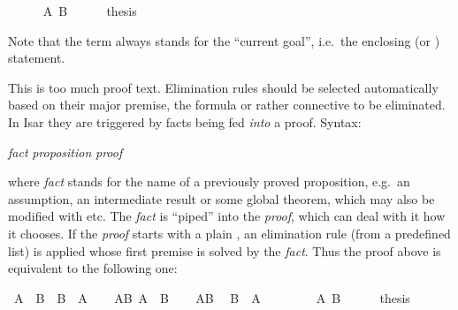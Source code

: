 \begin{isabellebody}
{}
\isanewline
\ \ \ \ \isamarkupfalse%
\ {\isachardoublequote}A{\isachardoublequote}\ {\isachardoublequote}B{\isachardoublequote}\isanewline
\ \ \ \ \isamarkupfalse%
\ {\isacharquery}thesis\ \isamarkupfalse%
\isacommand{{\isachardot}{\isachardot}}\isanewline
\ \ \isamarkupfalse%
\isanewline
\isamarkupfalse%
\isamarkupfalse%
%
\begin{isamarkuptext}%
\noindent Note that the term  always stands for the
``current goal'', i.e.\ the enclosing  (or
) statement.

This is too much proof text. Elimination rules should be selected
automatically based on their major premise, the formula or rather connective
to be eliminated. In Isar they are triggered by facts being fed
\emph{into} a proof. Syntax:
\begin{center}
 \emph{fact}  \emph{proposition} \emph{proof}
\end{center}
where \emph{fact} stands for the name of a previously proved
proposition, e.g.\ an assumption, an intermediate result or some global
theorem, which may also be modified with  etc.
The \emph{fact} is ``piped'' into the \emph{proof}, which can deal with it
how it chooses. If the \emph{proof} starts with a plain ,
an elimination rule (from a predefined list) is applied
whose first premise is solved by the \emph{fact}. Thus the proof above
is equivalent to the following one:%
\end{isamarkuptext}%
\isamarkuptrue%
\ {\isachardoublequote}A\ {\isasymand}\ B\ {\isasymlongrightarrow}\ B\ {\isasymand}\ A{\isachardoublequote}\isanewline
\isamarkupfalse%
\isanewline
\ \ \isamarkupfalse%
\ AB{\isacharcolon}\ {\isachardoublequote}A\ {\isasymand}\ B{\isachardoublequote}\isanewline
\ \ \isamarkupfalse%
\ AB\ \isamarkupfalse%
\ {\isachardoublequote}B\ {\isasymand}\ A{\isachardoublequote}\isanewline
\ \ \isamarkupfalse%
\isanewline
\ \ \ \ \isamarkupfalse%
\ {\isachardoublequote}A{\isachardoublequote}\ {\isachardoublequote}B{\isachardoublequote}\isanewline
\ \ \ \ \isamarkupfalse%
\ {\isacharquery}thesis\ \isamarkupfalse%
\isacommand{{\isachardot}{\isachardot}}\isanewline
\ \ \isamarkupfalse%
\isanewline
\isamarkupfalse%
\isamarkupfalse%
%
\begin{isamarkuptext}%

\end{isamarkuptext}
\end{isabellebody}
